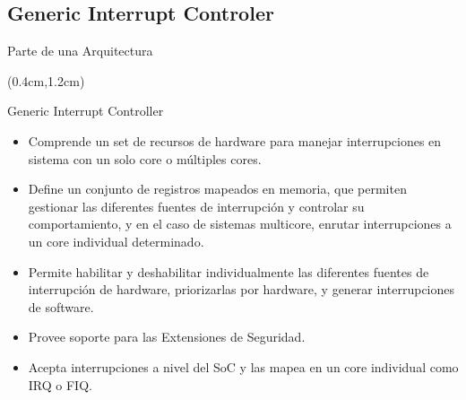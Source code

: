 \documentclass[usenames,table,xcolor={x11names},aspectratio=169]{beamer}
\begin{document}
\subsection{Generic Interrupt Controler}
\begin{frame}[t]{Parte de una Arquitectura}
 \begin{textblock*}{\textwidth}(0.4cm,1.2cm)
  \begin{block}{Generic Interrupt Controller}
   \begin{itemize}[<+(1)->]\justifying
    \item Comprende un set de recursos de hardware para manejar interrupciones en sistema con un solo core o múltiples cores. 
    \item Define un conjunto de registros mapeados en memoria, que permiten gestionar las diferentes fuentes de interrupción y controlar su comportamiento, y en el caso de sistemas multicore, enrutar interrupciones a un core individual determinado.
    \item Permite habilitar y deshabilitar individualmente las diferentes fuentes de interrupción de hardware, priorizarlas por hardware, y generar interrupciones de software. 
    \item Provee soporte para las Extensiones de Seguridad.
    \item Acepta interrupciones a nivel del SoC y las mapea en un core individual como IRQ o FIQ.
   \end{itemize}
  \end{block}
 \end{textblock*}
\end{frame}
\end{document}
